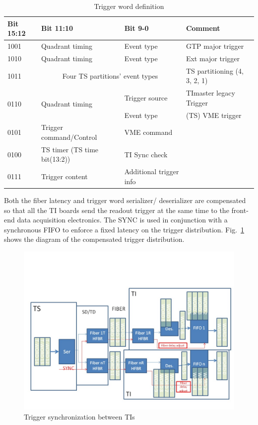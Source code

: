 \begin{table}
\begin{adjustbox}{width=\columnwidth,center}
	\begin{tabular}{| l | l | l | l |}
		\hline \hline
		Bit 15:12		& 	Bit 11:10 &	Bit 9-0	 & Comment		\\
		\hline
	1001	& Quadrant timing	& Event type	 & GTP major trigger \\
	1010	& Quadrant timing	& Event type	 & Ext major trigger \\
	
	1011	& \multicolumn{2}{c}{Four TS partitions’ event types}    & TS partitioning (4, 3, 2, 1) \\

	\multirow{2}{*}{0110}	& \multirow{2}{*}{Quadrant timing}	& Trigger source & TImaster legacy Trigger \\
		    &                   & Event type	 & (TS) VME trigger     \\
	0101	& Trigger command/Control	& VME command \\
	0100	& TS timer (TS time bit(13:2))	& TI Sync check \\
	0111	& Trigger content	& Additional trigger info \\
		\hline \hline
	\end{tabular}
\end{adjustbox}
\caption{Trigger word definition}
\label{tab:trigger_word_definition.}
\end{table}

Both the fiber latency and trigger word serializer/ deserializer are compensated so that all the TI boards send the readout trigger at the same time to the front-end data acquisition electronics.  The SYNC is used in conjunction with a synchronous FIFO to enforce a fixed latency on the trigger distribution. Fig.~\ref{fig:TIsync} shows the diagram of the compensated trigger distribution.

\begin{figure}[hbt]
	\centering
	\includegraphics[width=1.0\columnwidth,keepaspectratio]{img/TrgSync.jpg}
	\caption{Trigger synchronization between TIs}
	\label{fig:TIsync}
\end{figure}

